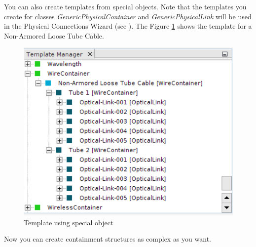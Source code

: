 \documentclass[a4paper]{article}
\begin{document}
	You can also create templates from special objects. Note that the templates you create for classes \textit{GenericPhysicalContainer} and \textit{GenericPhysicalLink} will be used in the Physical Connections Wizard (see \textbf{}). The Figure \ref{fig:template_with_special_objects} shows the template for a Non-Armored Loose Tube Cable. 
	
	\begin{figure}[h!]
		\centering
		\includegraphics[width=0.6\linewidth]{img/template_with_special_objects.png}
		\caption{Template using special object}
		\label{fig:template_with_special_objects}
	\end{figure}
	
	Now you can create containment structures as complex as you want.\\
	
\end{document}
